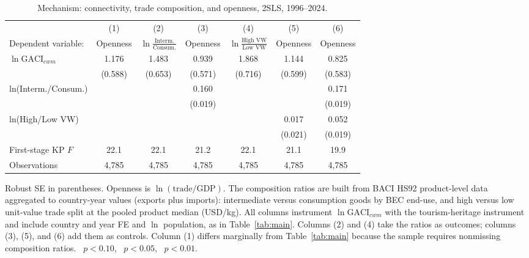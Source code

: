 \begin{table}[H]
\centering
\caption{Mechanism: connectivity, trade composition, and openness, 2SLS,
1996--2024.}
\label{tab:mechanism}
\begin{threeparttable}
\small
\begin{tabular}{lcccccc}
\toprule
 & (1) & (2) & (3) & (4) & (5) & (6) \\
Dependent variable: & Openness & $\ln\frac{\text{Interm.}}{\text{Consum.}}$ & Openness & $\ln\frac{\text{High VW}}{\text{Low VW}}$ & Openness & Openness \\
\midrule
$\ln\mathrm{GACI}_{cwm}$ & 1.176\sym{**} & 1.483\sym{**} & 0.939 & 1.868\sym{***} & 1.144\sym{*} & 0.825 \\
  & (0.588) & (0.653) & (0.571) & (0.716) & (0.599) & (0.583) \\
ln(Interm./Consum.) &  &  & 0.160\sym{***} &  &  & 0.171\sym{***} \\
 &  &  & (0.019) &  &  & (0.019) \\
ln(High/Low VW) &  &  &  &  & 0.017 & 0.052\sym{***} \\
  &  &  &  &  & (0.021) & (0.019) \\
\midrule
First-stage KP $F$ & 22.1 & 22.1 & 21.2 & 22.1 & 21.1 & 19.9 \\
Observations & 4{,}785 & 4{,}785 & 4{,}785 & 4{,}785 & 4{,}785 & 4{,}785 \\
\bottomrule
\end{tabular}
\begin{tablenotes}\small
\item Robust SE in parentheses. Openness is $\ln(\text{trade}/\text{GDP})$.
The composition ratios are built from BACI HS92 product-level data aggregated
to country-year values (exports plus imports): intermediate versus consumption
goods by BEC end-use, and high versus low unit-value trade split at the pooled
product median (USD/kg). All columns instrument $\ln\mathrm{GACI}_{cwm}$ with
the tourism-heritage instrument and include country and year FE and $\ln$
population, as in Table~\ref{tab:main}. Columns (2) and (4) take the ratios as
outcomes; columns (3), (5), and (6) add them as controls. Column (1) differs
marginally from Table~\ref{tab:main} because the sample requires nonmissing
composition ratios.
\sym{*}~$p<0.10$, \sym{**}~$p<0.05$, \sym{***}~$p<0.01$.
\end{tablenotes}
\end{threeparttable}
\end{table}

